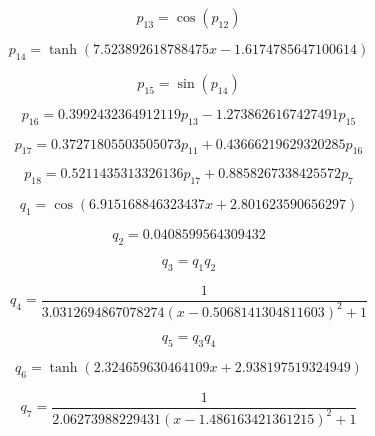 \begin{equation}
p_{13}=\cos{\left(p_{12} \right)}
\end{equation}


\begin{equation}
p_{14}=\tanh{\left(7.523892618788475 x - 1.6174785647100614 \right)}
\end{equation}


\begin{equation}
p_{15}=\sin{\left(p_{14} \right)}
\end{equation}


\begin{equation}
p_{16}=0.3992432364912119 p_{13} - 1.2738626167427491 p_{15}
\end{equation}


\begin{equation}
p_{17}=0.37271805503505073 p_{11} + 0.43666219629320285 p_{16}
\end{equation}


\begin{equation}
p_{18}=0.5211435313326136 p_{17} + 0.8858267338425572 p_{7}
\end{equation}


\begin{equation}
q_{1}=\cos{\left(6.915168846323437 x + 2.801623590656297 \right)}
\end{equation}


\begin{equation}
q_{2}=0.0408599564309432
\end{equation}


\begin{equation}
q_{3}=q_{1} q_{2}
\end{equation}


\begin{equation}
q_{4}=\frac{1}{3.0312694867078274 \left(x - 0.5068141304811603\right)^{2} + 1}
\end{equation}


\begin{equation}
q_{5}=q_{3} q_{4}
\end{equation}


\begin{equation}
q_{6}=\tanh{\left(2.324659630464109 x + 2.938197519324949 \right)}
\end{equation}


\begin{equation}
q_{7}=\frac{1}{2.06273988229431 \left(x - 1.486163421361215\right)^{2} + 1}
\end{equation}


